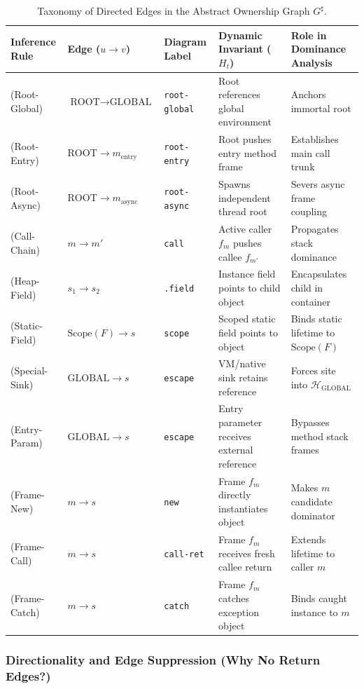 \documentclass[12pt,a4paper]{article}
\newcommand{\GLOBAL}{\text{GLOBAL}}
\newcommand{\ROOT}{\text{ROOT}}
\newcommand{\Scope}{\text{Scope}}
\begin{document}
\begin{table}[htbp]
\centering
\caption{Taxonomy of Directed Edges in the Abstract Ownership Graph $G^\sharp$.}
\label{tab:edge-taxonomy}
\small
\setlength{\tabcolsep}{3pt}
\begin{tabularx}{\textwidth}{@{}lllXX@{}}
\toprule
\textbf{Inference Rule} & \textbf{Edge ($u \to v$)} & \textbf{Diagram Label} & \textbf{Dynamic Invariant ($H_t$)} & \textbf{Role in Dominance Analysis} \\
\midrule
(Root-Global) & $\ROOT \to \GLOBAL$ & \texttt{root-global} & Root references global environment & Anchors immortal root \\
(Root-Entry)  & $\ROOT \to m_{\text{entry}}$ & \texttt{root-entry} & Root pushes entry method frame & Establishes main call trunk \\
(Root-Async)  & $\ROOT \to m_{\text{async}}$ & \texttt{root-async} & Spawns independent thread root & Severs async frame coupling \\
(Call-Chain)  & $m \to m'$ & \texttt{call} & Active caller $f_m$ pushes callee $f_{m'}$ & Propagates stack dominance \\
\midrule
(Heap-Field)  & $s_1 \to s_2$ & \texttt{.field} & Instance field points to child object & Encapsulates child in container \\
(Static-Field)& $\Scope(F) \to s$ & \texttt{scope} & Scoped static field points to object & Binds static lifetime to $\Scope(F)$ \\
(Special-Sink)& $\GLOBAL \to s$ & \texttt{escape} & VM/native sink retains reference & Forces site into $\mathcal{H}_{\GLOBAL}$ \\
(Entry-Param) & $\GLOBAL \to s$ & \texttt{escape} & Entry parameter receives external reference & Bypasses method stack frames \\
\midrule
(Frame-New)   & $m \to s$ & \texttt{new} & Frame $f_m$ directly instantiates object & Makes $m$ candidate dominator \\
(Frame-Call)  & $m \to s$ & \texttt{call-ret} & Frame $f_m$ receives fresh callee return & Extends lifetime to caller $m$ \\
(Frame-Catch) & $m \to s$ & \texttt{catch} & Frame $f_m$ catches exception object & Binds caught instance to $m$ \\
\bottomrule
\end{tabularx}
\end{table}

\subsubsection{Directionality and Edge Suppression (Why No Return Edges?)}
\end{document}
